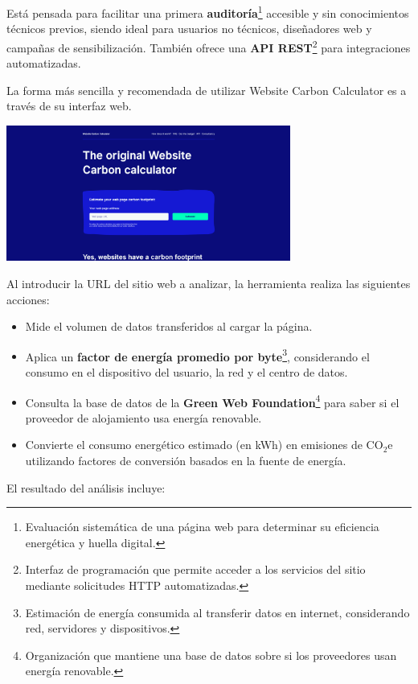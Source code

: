 \documentclass[12pt,a4paper]{report}
\begin{document}
Está pensada para facilitar una primera \textbf{auditoría}\footnote{Evaluación
  sistemática de una página web para determinar su eficiencia energética y huella
  digital.} accesible y sin conocimientos técnicos previos, siendo ideal para
usuarios no técnicos, diseñadores web y campañas de sensibilización. También
ofrece una \textbf{API REST}\footnote{Interfaz de programación que permite
  acceder a los servicios del sitio mediante solicitudes HTTP automatizadas.}
para integraciones automatizadas.

La forma más sencilla y recomendada de utilizar Website Carbon Calculator es a
través de su interfaz web.

\begin{center}
  \includegraphics[width=0.7\textwidth]{imagenes/WCC_1.png}
\end{center}

Al introducir la URL del sitio web a analizar, la herramienta realiza las
siguientes acciones:

\begin{itemize}
  \item Mide el volumen de datos transferidos al cargar la página.
  \item Aplica un \textbf{factor de energía promedio por byte}\footnote{Estimación de
          energía consumida al transferir datos en internet, considerando red, servidores
          y dispositivos.}, considerando el consumo en el dispositivo del usuario, la red
        y el centro de datos.
  \item Consulta la base de datos de la \textbf{Green Web
          Foundation}\footnote{Organización que mantiene una base de datos sobre si los
          proveedores usan energía renovable.} para saber si el proveedor de alojamiento
        usa energía renovable.
  \item Convierte el consumo energético estimado (en kWh) en emisiones de CO$_2$e
        utilizando factores de conversión basados en la fuente de energía.
\end{itemize}

El resultado del análisis incluye:
\end{document}
